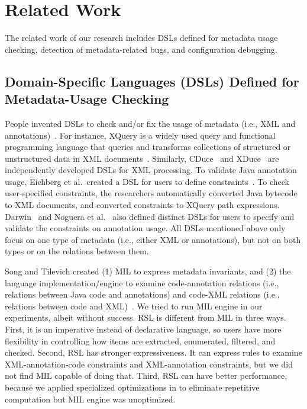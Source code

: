 \section{Related Work}\label{se:related}
The related work of our research includes DSLs defined for metadata usage checking, detection of metadata-related bugs, and configuration debugging.

  \vspace{-.5em}
\subsection{Domain-Specific Languages (DSLs) Defined for Metadata-Usage Checking}

People invented DSLs to check and/or fix the usage of metadata (i.e., XML and annotations)~\cite{
benzaken2003cduce,chamberlin2002xquery,hosoya2003xduce,darwin2009annabot,eichberg2005using,Song12,noguera2008annotation}. For instance, XQuery is a widely used query and functional programming language that queries and transforms collections of structured or unstructured data in XML documents~\cite{chamberlin2002xquery}. Similarly, CDuce~\cite{benzaken2003cduce} and XDuce~\cite{hosoya2003xduce} are independently developed DSLs for XML processing. 
To validate Java annotation usage, 
Eichberg et al.~created a DSL for users to define constraints~\cite{eichberg2005using}. To check user-specified constraints, the researchers automatically converted Java bytecode to XML documents, and converted constraints to XQuery path expressions.  Darwin~\cite{darwin2009annabot} and Noguera et al.~\cite{noguera2008annotation} also  defined distinct DSLs for users to specify and  validate the constraints on annotation usage. 
All DSLs mentioned above only focus on one type of metadata (i.e., either XML or annotations), but not on both types or on the relations between them. 



Song and Tilevich created (1) MIL to express metadata invariants, and (2) the language implementation/engine to 
examine code-annotation relations (i.e., relations between Java code and annotations) and code-XML relations (i.e., relations between code and XML)~\cite{Song12}. We tried to run MIL engine in our experiments, albeit without success. RSL is different from MIL in three ways. First, it is an imperative instead of declarative language, so users have more flexibility in controlling how items are extracted, enumerated, filtered, and checked. 
Second, RSL has stronger expressiveness. It can express rules to examine 
XML-annotation-code constraints and XML-annotation constraints, but we did not find MIL capable of doing that. Third, RSL can  have better performance, because we applied specialized optimizations in \tool to eliminate repetitive computation but MIL engine was unoptimized.


